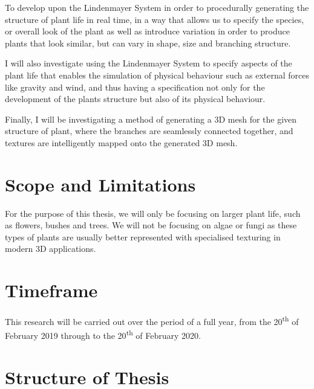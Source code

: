 \begin{flushleft}

To develop upon the Lindenmayer System in order to procedurally generating the structure of plant life in real time, in a way that allows us to specify the species, or overall look of the plant as well as introduce variation in order to produce plants that look similar, but can vary in shape, size and branching structure. \\

\vspace{5mm}

I will also investigate using the Lindenmayer System to specify aspects of the plant life that enables the simulation of physical behaviour such as external forces like gravity and wind, and thus having a specification not only for the development of the plants structure but also of its physical behaviour. \\

\vspace{5mm}

Finally, I will be investigating a method of generating a 3D mesh for the given structure of plant, where the branches are seamlessly connected together, and textures are intelligently mapped onto the generated 3D mesh.\\ 

\end{flushleft} 


\section{Scope and Limitations}

\begin{flushleft}

For the purpose of this thesis, we will only be focusing on larger plant life, such as flowers, bushes and trees. We will not be focusing on algae or fungi as these types of plants are usually better represented with specialised texturing in modern 3D applications.\\

\vspace{5mm}



\end{flushleft}

\section{Timeframe}

\begin{flushleft}

This research will be carried out over the period of a full year, from the 20\textsuperscript{th} of February 2019 through to the 20\textsuperscript{th} of February 2020. 

\end{flushleft}

\section{Structure of Thesis}




